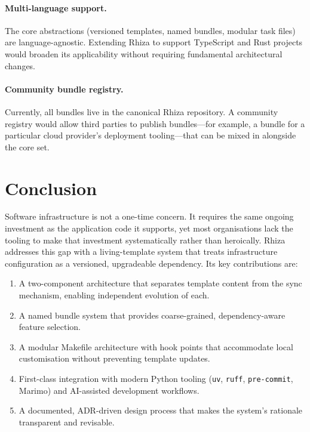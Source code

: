 \documentclass[12pt,a4paper]{article}
\begin{document}
\paragraph{Multi-language support.} The core abstractions (versioned templates, named bundles, modular task files) are language-agnostic. Extending Rhiza to support TypeScript and Rust projects would broaden its applicability without requiring fundamental architectural changes.

\paragraph{Community bundle registry.} Currently, all bundles live in the canonical Rhiza repository. A community registry would allow third parties to publish bundles---for example, a bundle for a particular cloud provider's deployment tooling---that can be mixed in alongside the core set.

\section{Conclusion}
\label{sec:conclusion}

Software infrastructure is not a one-time concern. It requires the same ongoing investment as the application code it supports, yet most organisations lack the tooling to make that investment systematically rather than heroically. Rhiza addresses this gap with a living-template system that treats infrastructure configuration as a versioned, upgradeable dependency. Its key contributions are:

\begin{enumerate}[leftmargin=*]
  \item A two-component architecture that separates template content from the sync mechanism, enabling independent evolution of each.
  \item A named bundle system that provides coarse-grained, dependency-aware feature selection.
  \item A modular Makefile architecture with hook points that accommodate local customisation without preventing template updates.
  \item First-class integration with modern Python tooling (\texttt{uv}, \texttt{ruff}, \texttt{pre-commit}, Marimo) and AI-assisted development workflows.
  \item A documented, ADR-driven design process that makes the system's rationale transparent and revisable.
\end{enumerate}
\end{document}
